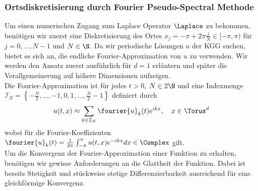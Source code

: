 \subsubsection*{Ortsdiskretisierung durch Fourier Pseudo-Spectral Methode}
Um einen numerischen Zugang zum Laplace Operator $\Laplace$ zu bekommen, benötigen wir zuerst eine Diskretisierung des Ortes $x_j=-\pi+2\pi\frac{j}{N}\in [-\pi,\pi)$ für $j=0,\dots,N-1$ und $N\in\N$. Da wir periodische Lösungen $u$ der KGG suchen, bietet es sich an, die endliche Fourier-Approximation von $u$ zu verwenden. Wir werden den Ansatz zuerst ausführlich für $d=1$ erläutern und später die Verallgemeinerung auf höhere Dimensionen aufzeigen.\\
Die Fourier-Approximation ist für jedes $t>0$, $N\in 2\N$ und eine Indexmenge $\mathcal{I}_N=\left\lbrace -\frac{N}{2},\dots,-1,0,1,\dots,\frac{N}{2}-1\right\rbrace$ definiert durch
\begin{equation}
\label{eqn:fourier_approx}
u(t,x)\approx \sum_{k\in\mathcal{I}_N}\fourier{u}_k(t)e^{ikx}, \quad x\in\Torus^d
\end{equation}
wobei für die Fourier-Koeffizienten $\fourier{u}_k(t)=\frac{1}{2\pi}\int_{-\pi}^\pi u(t,x)e^{-ikx}dx\in\Complex$ gilt. \\
Um die Konvergenz der Fourier-Approximation einer Funktion zu erhalten, benötigen wir gewisse Anforderungen an die Glattheit der Funktion. Dabei ist bereits Stetigkeit und stückweise stetige Differenzierbarkeit ausreichend für eine gleichförmige Konvergenz. 
